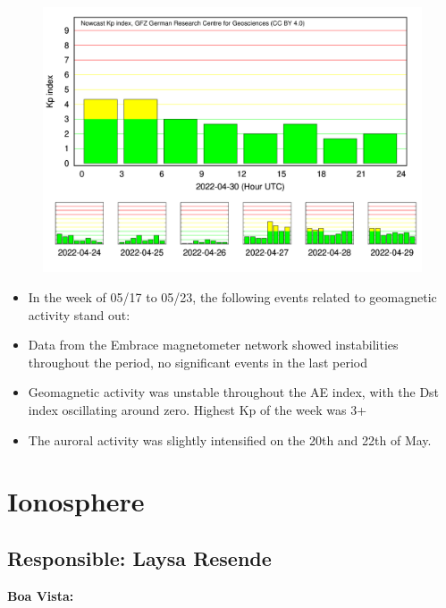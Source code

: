 \documentclass[a4paper, 10pt]{article}
\begin{document}
                     \begin{figure}[H]
    
                        \centering
   
                             \includegraphics[width=14cm]{./figures//figureGeomag_7.png}

                        \end{figure}

                     \begin{itemize} 
\item In the week of 05/17 to 05/23, the following events related to geomagnetic activity stand out:
\item Data from the Embrace magnetometer network showed instabilities throughout the period, no significant events in the last period
\item Geomagnetic activity was unstable throughout the AE index, with the Dst index oscillating around zero. Highest Kp of the week was 3+
\item  The auroral activity was slightly intensified on the 20th and 22th of May.
\end{itemize} 
\section{Ionosphere} 
 \subsection{Responsible: Laysa Resende} 
 
\textbf{Boa Vista: }
\end{document}
